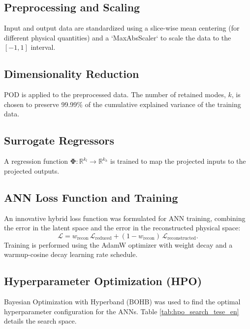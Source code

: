 \documentclass[dscexam, EN]{ufabcFHZh}
\begin{document}
\subsection{Preprocessing and Scaling}
Input and output data are standardized using a slice-wise mean centering (for different physical quantities) and a `MaxAbsScaler` to scale the data to the $[-1, 1]$ interval.

\subsection{Dimensionality Reduction}
POD is applied to the preprocessed data. The number of retained modes, $k$, is chosen to preserve 99.99\% of the cumulative explained variance of the training data.

\subsection{Surrogate Regressors}
A regression function $\boldsymbol{\Phi}: \mathbb{R}^{k_l} \rightarrow \mathbb{R}^{k_h}$ is trained to map the projected inputs to the projected outputs.

\subsection{ANN Loss Function and Training}
An innovative hybrid loss function was formulated for ANN training, combining the error in the latent space and the error in the reconstructed physical space:
\begin{equation}
  \mathcal{L} = w_{\mathrm{recon}}\,\mathcal{L}_{\mathrm{reduced}} + (1 - w_{\mathrm{recon}})\,\mathcal{L}_{\mathrm{reconstructed}}.
\end{equation}
Training is performed using the AdamW optimizer with weight decay and a warmup-cosine decay learning rate schedule.

\subsection{Hyperparameter Optimization (HPO)}
Bayesian Optimization with Hyperband (BOHB) was used to find the optimal hyperparameter configuration for the ANNs. Table \ref{tab:hpo_search_tese_en} details the search space.
\end{document}
